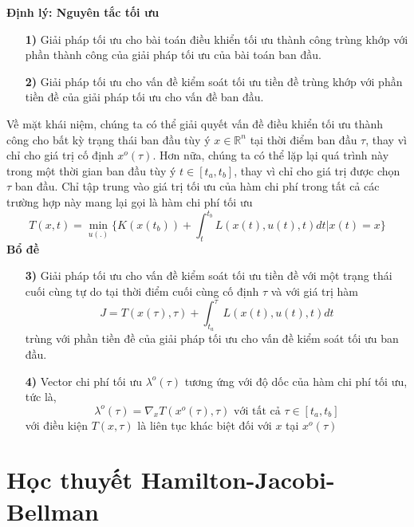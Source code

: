 \documentclass[12pt,a4paper]{report}
\begin{document}
	\textbf{Định lý: Nguyên tắc tối ưu}
	\begin{itemize}
		\item[\textbf{1)}] Giải pháp tối ưu cho bài toán điều khiển tối ưu thành công trùng khớp với phần thành công của giải pháp tối ưu của bài toán ban đầu.
		\item[\textbf{2)}] Giải pháp tối ưu cho vấn đề kiểm soát tối ưu tiền đề trùng khớp với phần tiền đề của giải pháp tối ưu cho vấn đề ban đầu. 
	\end{itemize}
	\noindent
	Về mặt khái niệm, chúng ta có thể giải quyết vấn đề điều khiển tối ưu thành công cho bất kỳ trạng thái ban đầu tùy ý $x\in \mathbb{R}^n$ tại thời điểm ban đầu $\tau$, thay vì chỉ cho giá trị cố định $x^o(\tau)$. Hơn nữa, chúng ta có thể lặp lại quá trình này trong một thời gian ban đầu tùy ý $t \in [t_a, t_b]$, thay vì chỉ cho giá trị được chọn $\tau$ ban đầu. Chỉ tập trung vào giá trị tối ưu của hàm chi phí trong tất cả các trường hợp này mang lại gọi là hàm chi phí tối ưu $$T(x,t) = \min_{u(.)} \bigg\{K(x(t_b)) + \int_{t}^{t_b}L(x(t),u(t),t)dt \big | x(t) = x \bigg\}$$
	\textbf{Bổ đề}
	\begin{enumerate}
		\item[\textbf{3)}] Giải pháp tối ưu cho vấn đề kiểm soát tối ưu tiền đề với một
		trạng thái cuối cùng tự do tại thời điểm cuối cùng cố định $\tau$ và với giá trị hàm $$J = T(x(\tau), \tau) + \int_{t_a}^{\tau}L(x(t), u(t), t)dt$$ trùng với phần tiền đề của giải pháp tối ưu cho vấn đề kiểm soát tối ưu ban đầu.
		\item[\textbf{4)}] Vector chi phí tối ưu $\lambda^o(\tau)$ tương ứng với độ dốc của hàm chi phí tối ưu, tức là, $$\lambda^o(\tau) = \nabla _xT(x^o(\tau), \tau) \text{ với tất cả } \tau \in [t_a, t_b]$$ với điều kiện $T(x, \tau) $ là liên tục khác biệt đối với $x$ tại $x^o(\tau)$
	\end{enumerate}
	\section{Học thuyết Hamilton-Jacobi-Bellman}
\end{document}
